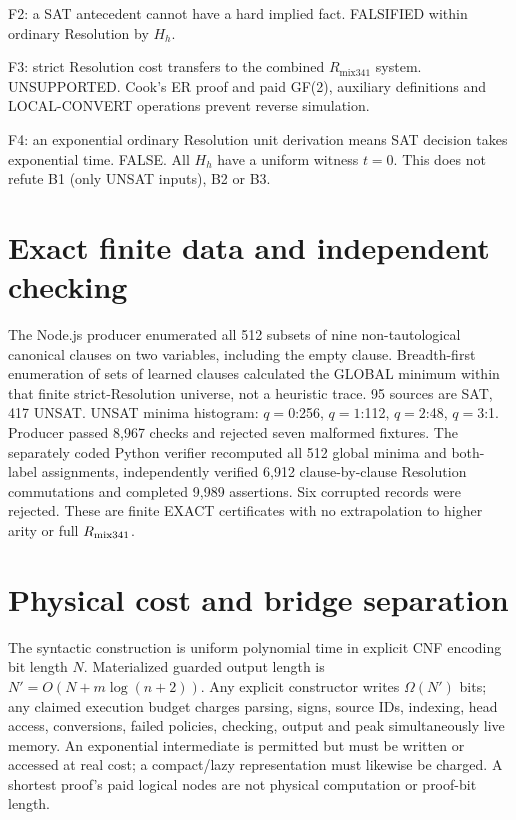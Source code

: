 \documentclass[11pt]{article}
\begin{document}
\par\noindent F2: a SAT antecedent cannot have a hard implied fact. FALSIFIED within ordinary Resolution by $H_h$.

\par\noindent F3: strict Resolution cost transfers to the combined $R_{\mathrm{mix341}}$ system. UNSUPPORTED. Cook's ER proof and paid GF(2), auxiliary definitions and LOCAL-CONVERT operations prevent reverse simulation.

\par\noindent F4: an exponential ordinary Resolution unit derivation means SAT decision takes exponential time. FALSE. All $H_h$ have a uniform witness $t=0$. This does not refute B1 (only UNSAT inputs), B2 or B3.

\section*{Exact finite data and independent checking}
The Node.js producer enumerated all 512 subsets of nine non-tautological canonical clauses on two variables, including the empty clause. Breadth-first enumeration of sets of learned clauses calculated the GLOBAL minimum within that finite strict-Resolution universe, not a heuristic trace. 95 sources are SAT, 417 UNSAT. UNSAT minima histogram: $q=0$:256, $q=1$:112, $q=2$:48, $q=3$:1. Producer passed 8,967 checks and rejected seven malformed fixtures. The separately coded Python verifier recomputed all 512 global minima and both-label assignments, independently verified 6,912 clause-by-clause Resolution commutations and completed 9,989 assertions. Six corrupted records were rejected. These are finite EXACT certificates with no extrapolation to higher arity or full $R_{\rm mix341}$.

\section*{Physical cost and bridge separation}
The syntactic construction is uniform polynomial time in explicit CNF encoding bit length $N$. Materialized guarded output length is $N'=O(N+m\log(n+2))$. Any explicit constructor writes $\Omega(N')$ bits; any claimed execution budget charges parsing, signs, source IDs, indexing, head access, conversions, failed policies, checking, output and peak simultaneously live memory. An exponential intermediate is permitted but must be written or accessed at real cost; a compact/lazy representation must likewise be charged. A shortest proof's paid logical nodes are not physical computation or proof-bit length.
\end{document}
